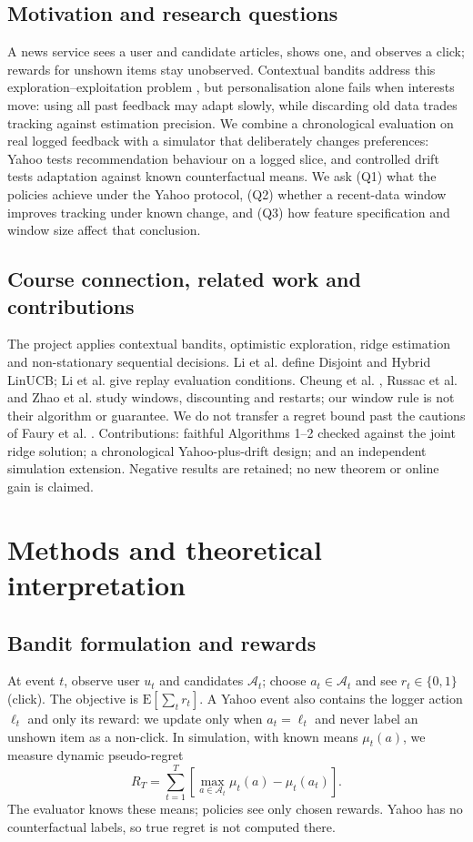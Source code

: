 \documentclass[10pt,a4paper]{article}
\newcommand{\E}{\mathrm{E}}
\begin{document}
\subsection{Motivation and research questions}
A news service sees a user and candidate articles, shows one, and observes
a click; rewards for unshown items stay unobserved. Contextual bandits
address this exploration--exploitation problem \cite{li2010}, but
personalisation alone fails when interests move: using all past feedback
may adapt slowly, while discarding old data trades tracking against
estimation precision. We combine a chronological evaluation on real logged
feedback with a simulator that deliberately changes preferences: Yahoo
tests recommendation behaviour on a logged slice, and controlled drift
tests adaptation against known counterfactual means. We ask (Q1) what the
policies achieve under the Yahoo protocol, (Q2) whether a recent-data
window improves tracking under known change, and (Q3) how feature
specification and window size affect that conclusion.

\subsection{Course connection, related work and contributions}
The project applies contextual bandits, optimistic exploration, ridge
estimation and non-stationary sequential decisions. Li et al.
\cite{li2010} define Disjoint and Hybrid LinUCB; Li et al. \cite{li2011}
give replay evaluation conditions. Cheung et al. \cite{cheung2019}, Russac
et al. \cite{russac2019} and Zhao et al. \cite{zhao2020} study windows,
discounting and restarts; our window rule is not their algorithm or
guarantee. We do not transfer a regret bound past the cautions of Faury et
al. \cite{faury2021}. Contributions: faithful Algorithms 1--2 checked
against the joint ridge solution; a chronological Yahoo-plus-drift design;
and an independent simulation extension. Negative results are retained;
no new theorem or online gain is claimed.

\section{Methods and theoretical interpretation}
\subsection{Bandit formulation and rewards}
At event $t$, observe user $u_t$ and candidates $\mathcal A_t$; choose
$a_t\in\mathcal A_t$ and see $r_t\in\{0,1\}$ (click). The objective is
$\E[\sum_t r_t]$. A Yahoo event also contains the logger action $\ell_t$
and only its reward: we update only when $a_t=\ell_t$ and never label an
unshown item as a non-click. In simulation, with known means $\mu_t(a)$,
we measure dynamic pseudo-regret
\begin{equation}
R_T=\sum_{t=1}^T\left[\max_{a\in\mathcal A_t}\mu_t(a)-\mu_t(a_t)\right].
\label{eq:regret}
\end{equation}
The evaluator knows these means; policies see only chosen rewards. Yahoo
has no counterfactual labels, so true regret is not computed there.
\end{document}
